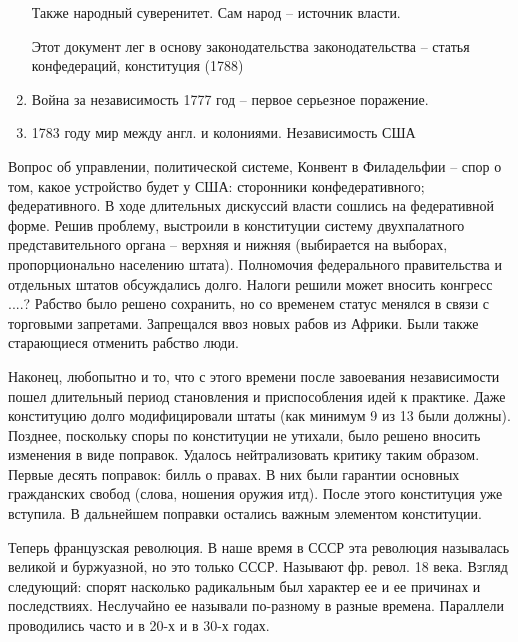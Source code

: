 \documentclass[a4paper, 12pt]{article}
\begin{document}
\begin{multicols}{2}
\begin{enumerate}
  \subitem Также народный суверенитет. Сам народ -- источник власти. 
  
  \subitem Этот документ лег в основу законодательства законодательства -- статья конфедераций, конституция (1788)
  
\item Война за независимость 1777 год -- первое серьезное поражение. 
\item 1783 году мир между англ. и колониями. Независимость США
\end{enumerate}

Вопрос об управлении, политической системе, Конвент в Филадельфии -- спор о том, какое устройство будет у США: сторонники конфедеративного; федеративного. В ходе длительных дискуссий власти сошлись на федеративной форме. Решив проблему, выстроили в конституции систему двухпалатного представительного органа -- верхняя и нижняя (выбирается на выборах, пропорционально населению штата). Полномочия федерального правительства и отдельных штатов обсуждались долго. Налоги решили может вносить конгресс ....? Рабство было решено сохранить, но со временем статус менялся в связи с торговыми запретами. Запрещался ввоз новых рабов из Африки. 
Были также старающиеся отменить рабство люди. 

Наконец, любопытно и то, что с этого времени после завоевания независимости пошел длительный период становления и приспособления идей к практике. Даже конституцию долго модифицировали штаты (как минимум 9 из 13 были должны). Позднее, поскольку споры по конституции не утихали, было решено вносить изменения в виде поправок. Удалось нейтрализовать критику таким образом. Первые десять поправок: билль о правах. В них были гарантии основных гражданских свобод (слова, ношения оружия итд). После этого конституция уже вступила. В дальнейшем поправки остались важным элементом конституции. 

Теперь французская революция. В наше время в СССР эта революция называлась великой и буржуазной, но это только СССР. Называют фр. револ. 18 века. Взгляд следующий: спорят насколько радикальным был характер ее и ее причинах и последствиях. Неслучайно ее называли по-разному в  разные времена. Параллели проводились часто и в 20-х и в 30-х годах. 


\end{multicols}
\end{document}

